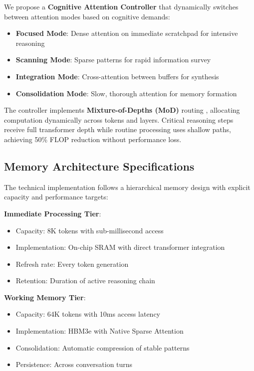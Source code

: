 \documentclass[10pt,twocolumn]{article}
\begin{document}
We propose a \textbf{Cognitive Attention Controller} that dynamically switches between attention modes based on cognitive demands:
\begin{itemize}
\item \textbf{Focused Mode}: Dense attention on immediate scratchpad for intensive reasoning
\item \textbf{Scanning Mode}: Sparse patterns for rapid information survey
\item \textbf{Integration Mode}: Cross-attention between buffers for synthesis
\item \textbf{Consolidation Mode}: Slow, thorough attention for memory formation
\end{itemize}

The controller implements \textbf{Mixture-of-Depths (MoD)} routing \cite{raposo2024mixture}, allocating computation dynamically across tokens and layers. Critical reasoning steps receive full transformer depth while routine processing uses shallow paths, achieving 50\% FLOP reduction without performance loss.

\subsection{Memory Architecture Specifications}

The technical implementation follows a hierarchical memory design with explicit capacity and performance targets:

\textbf{Immediate Processing Tier}:
\begin{itemize}
\item Capacity: 8K tokens with sub-millisecond access
\item Implementation: On-chip SRAM with direct transformer integration
\item Refresh rate: Every token generation
\item Retention: Duration of active reasoning chain
\end{itemize}

\textbf{Working Memory Tier}:
\begin{itemize}
\item Capacity: 64K tokens with 10ms access latency
\item Implementation: HBM3e with Native Sparse Attention
\item Consolidation: Automatic compression of stable patterns
\item Persistence: Across conversation turns
\end{itemize}
\end{document}
